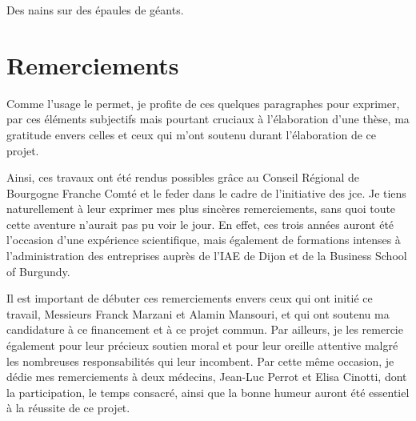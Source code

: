 \documentclass[english,standardlists]{spimubphdthesis}
\begin{document}
\dominitoc



\parbox[t]{\textwidth}
{
    \vspace{1.5cm}
	\begin{fquote}
		Des nains sur des épaules de géants.
	\end{fquote}	
}
	
\chapter*{Remerciements}
Comme l'usage le permet, je profite de ces quelques paragraphes pour exprimer, par ces éléments subjectifs mais pourtant cruciaux à l'élaboration d'une thèse, ma gratitude envers celles et ceux qui m'ont soutenu durant l'élaboration de ce projet.\par

Ainsi, ces travaux ont été rendus possibles grâce au Conseil Régional de Bourgogne Franche Comté et le \gls{feder} dans le cadre de l'initiative des \gls{jce}. Je tiens naturellement à leur exprimer mes plus sincères remerciements, sans quoi toute cette aventure n'aurait pas pu voir le jour. En effet, ces trois années auront été l'occasion d'une expérience scientifique, mais également de formations intenses à l'administration des entreprises auprès de l'IAE de Dijon et de la Business School of Burgundy.\par

Il est important de débuter ces remerciements envers ceux qui ont initié ce travail, Messieurs Franck Marzani et Alamin Mansouri, et qui ont soutenu ma candidature à ce financement et à ce projet commun. Par ailleurs, je les remercie également pour leur précieux soutien moral et pour leur oreille attentive malgré les nombreuses responsabilités qui leur incombent. Par cette même occasion, je dédie mes remerciements à deux médecins, Jean-Luc Perrot et Elisa Cinotti, dont la participation, le temps consacré, ainsi que la bonne humeur auront été essentiel à la réussite de ce projet.\par
\end{document}
